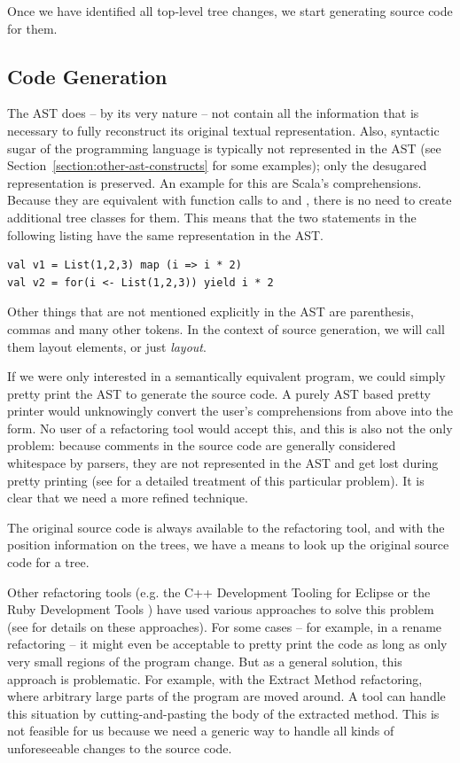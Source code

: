 Once we have identified all top-level tree changes, we start generating source code for them. 

\subsection{Code Generation}

The AST does -- by its very nature -- not contain all the information that is necessary to fully reconstruct its original textual representation. Also, syntactic sugar of the programming language is typically not represented in the AST (see Section~\vref{section:other-ast-constructs} for some examples); only the desugared representation is preserved. An example for this are Scala's  comprehensions. Because they are equivalent with function calls to  and , there is no need to create additional tree classes for them. This means that the two statements in the following listing have the same representation in the AST.

\begin{lstlisting}
val v1 = List(1,2,3) map (i => i * 2)
val v2 = for(i <- List(1,2,3)) yield i * 2
\end{lstlisting}

Other things that are not mentioned explicitly in the AST are parenthesis, commas and many other tokens. In the context of source generation, we will call them layout elements, or just \textit{layout}. 

If we were only interested in a semantically equivalent program, we could simply pretty print the AST to generate the source code. A purely AST based pretty printer would unknowingly convert the user's  comprehensions from above into the  form. No user of a refactoring tool would accept this, and this is also not the only problem: because comments in the source code are generally considered whitespace by parsers, they are not represented in the AST and get lost during pretty printing (see \cite{RetainingComments} for a detailed treatment of this particular problem). It is clear that we need a more refined technique.

The original source code is always available to the refactoring tool, and with the position information on the trees, we have a means to look up the original source code for a tree.

Other refactoring tools (e.g. the C++ Development Tooling for Eclipse \cite{CdtOopsla} or the Ruby Development Tools \cite{RubyOopsla}) have used various approaches to solve this problem (see \cite{ScalaRefactoring} for details on these approaches). For some cases -- for example, in a rename refactoring -- it might even be acceptable to pretty print the code as long as only very small regions of the program change. But as a general solution, this approach is problematic. For example, with the Extract Method refactoring, where arbitrary large parts of the program are moved around. A tool can handle this situation by cutting-and-pasting the body of the extracted method. This is not feasible for us because we need a generic way to handle all kinds of unforeseeable changes to the source code.

